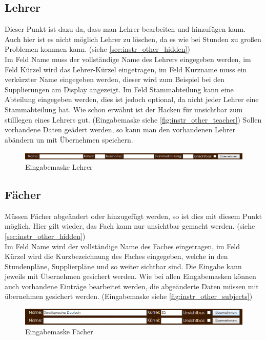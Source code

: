 \subsection{Lehrer}
Dieser Punkt ist dazu da, dass man Lehrer bearbeiten und hinzufügen kann. Auch hier ist es nicht möglich Lehrer zu löschen, da es wie bei Stunden zu großen Problemen kommen kann. (siehe \autoref{sec:instr_other_hidden})\\
Im Feld Name muss der vollständige Name des Lehrers eingegeben werden, im Feld Kürzel wird das Lehrer-Kürzel eingetragen, im Feld Kurzname muss ein verkürzter Name eingegeben werden, dieser wird zum Beispiel bei den Supplierungen am Display angezeigt. Im Feld Stammabteilung kann eine Abteilung eingegeben werden, dies ist jedoch optional, da nicht jeder Lehrer eine Stammabteilung hat. Wie schon erwähnt ist der Hacken für unsichtbar zum stilllegen eines Lehrers gut. (Eingabemaske siehe \autoref{fig:instr_other_teacher}) Sollen vorhandene Daten geädert werden, so kann man den vorhandenen Lehrer abändern un mit Übernehmen speichern.
\begin{figure}[H]
\centering
\includegraphics[keepaspectratio=true, width=17cm]{images/screenshots/teachers_input.png}
\caption{Eingabemaske Lehrer}
\label{fig:instr_other_teacher}
\end{figure}
\subsection{Fächer}
Müssen Fächer abgeändert oder hinzugefügt werden, so ist dies mit diesem Punkt möglich. Hier gilt wieder, das Fach kann nur unsichtbar gemacht werden. (siehe \autoref{sec:instr_other_hidden})\\
Im Feld Name wird der vollständige Name des Faches eingetragen, im Feld Kürzel wird die Kurzbezeichnung des Faches eingegeben, welche in den Stundenpläne, Supplierpläne und so weiter sichtbar sind. Die Eingabe kann jeweils mit Übernehmen gesichert werden. Wie bei allen Eingabemasken können auch vorhandene Einträge bearbeitet werden, die abgeänderte Daten müssen mit übernehmen gesichert werden. (Eingabemaske siehe \autoref{fig:instr_other_subjects})
\begin{figure}[H]
\centering
\includegraphics[keepaspectratio=true, width=17cm]{images/screenshots/subjects_input.png}
\caption{Eingabemaske Fächer}
\label{fig:instr_other_subjects}
\end{figure}
